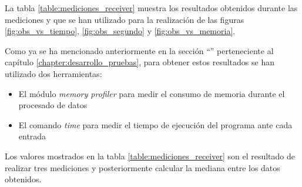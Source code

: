 La tabla \ref{table:mediciones_receiver} muestra los resultados obtenidos durante las mediciones y que se han utilizado para la realización de las figuras \ref{fig:obs_vs_tiempo}, \ref{fig:obs_segundo} y \ref{fig:obs_vs_memoria}.

Como ya se ha mencionado anteriormente en la sección ``'' perteneciente al capítulo \ref{chapter:desarrollo_pruebas}, para obtener estos resultados se han utilizado dos herramientas:
\begin{itemize}
	\item
		El módulo \textit{memory profiler} para medir el consumo de memoria durante el procesado de datos
	\item
		El comando \textit{time} para medir el tiempo de ejecución del programa ante cada entrada
\end{itemize}
Los valores mostrados en la tabla \ref{table:mediciones_receiver} son el resultado de realizar tres mediciones y posteriormente calcular la mediana entre los datos obtenidos.
